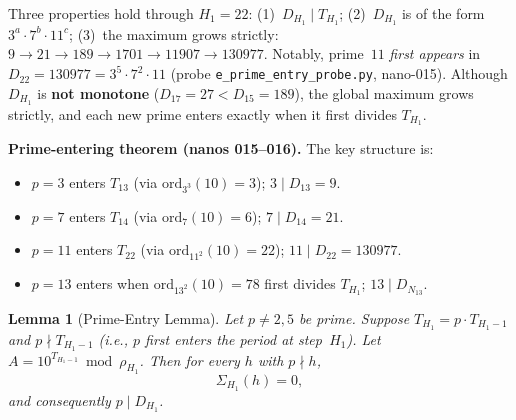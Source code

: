 \documentclass[
]{article}
\newtheorem{lemma}[theorem]{Lemma}
\begin{document}
\noindent
Three properties hold through $H_1=22$:
(1)~$D_{H_1}\mid T_{H_1}$;
(2)~$D_{H_1}$ is of the form $3^a\cdot 7^b\cdot 11^c$;
(3)~the maximum grows strictly: $9\to21\to189\to1701\to11907\to130977$.
Notably, prime~$11$ \emph{first appears} in $D_{22}=130977=3^5\cdot7^2\cdot11$
(probe \texttt{e\_prime\_entry\_probe.py}, nano-015).
Although $D_{H_1}$ is \textbf{not monotone} ($D_{17}=27<D_{15}=189$),
the global maximum grows strictly, and each new prime enters exactly
when it first divides $T_{H_1}$.

\noindent\textbf{Prime-entering theorem (nanos 015--016).}
The key structure is:
\begin{itemize}
\item $p=3$ enters $T_{13}$ (via $\mathrm{ord}_{3^3}(10)=3$); $3\mid D_{13}=9$.
\item $p=7$ enters $T_{14}$ (via $\mathrm{ord}_7(10)=6$); $7\mid D_{14}=21$.
\item $p=11$ enters $T_{22}$ (via $\mathrm{ord}_{11^2}(10)=22$); $11\mid D_{22}=130977$.
\item $p=13$ enters when $\mathrm{ord}_{13^2}(10)=78$ first divides $T_{H_1}$; $13\mid D_{N_{13}}$.
\end{itemize}

\begin{lemma}[Prime-Entry Lemma]\label{lem:prime-entry}
Let $p\ne 2,5$ be prime.
Suppose $T_{H_1}=p\cdot T_{H_1-1}$ and $p\nmid T_{H_1-1}$
(i.e., $p$ first enters the period at step~$H_1$).
Let $A=10^{T_{H_1-1}}\bmod\rho_{H_1}$.
Then for every $h$ with $p\nmid h$,
\[
  \Sigma_{H_1}(h)=0,
\]
and consequently $p\mid D_{H_1}$.
\end{lemma}
\end{document}

